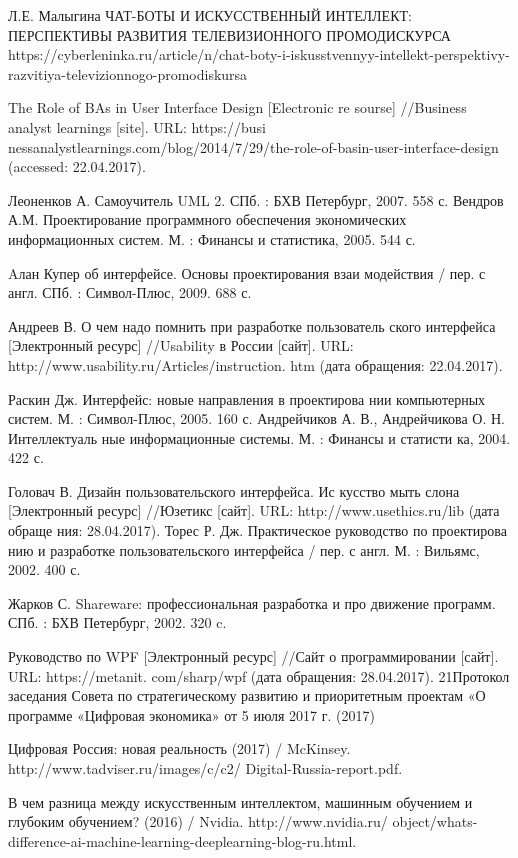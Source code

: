 \documentclass{article}
\begin{document}
 Л.Е. Малыгина
ЧАТ-БОТЫ И ИСКУССТВЕННЫЙ ИНТЕЛЛЕКТ: ПЕРСПЕКТИВЫ РАЗВИТИЯ ТЕЛЕВИЗИОННОГО ПРОМОДИСКУРСА 
https://cyberleninka.ru/article/n/chat-boty-i-iskusstvennyy-intellekt-perspektivy-razvitiya-televizionnogo-promodiskursa

The Role of BAs in User Interface Design [Electronic re  sourse] //Business analyst learnings [site]. URL: https://busi  nessanalystlearnings.com/blog/2014/7/29/the-role-of-basin-user-interface-design (accessed: 22.04.2017). 

Леоненков А. Самоучитель UML 2. СПб. : БХВ Петербург, 2007. 558 с.
 Вендров А.М. Проектирование программного обеспечения экономических информационных систем. М. : Финансы и статистика, 2005. 544 с.

Aлан Купер об интерфейсе. Основы проектирования взаи  модействия / пер. с англ. СПб. : Символ-Плюс, 2009. 688 с.

Андреев В. О чем надо помнить при разработке пользователь  ского интерфейса [Электронный ресурс] //Usability в России [сайт]. URL: http://www.usability.ru/Articles/instruction. htm (дата обращения: 22.04.2017).

 Раскин Дж. Интерфейс: новые направления в проектирова  нии компьютерных систем. М. : Символ-Плюс, 2005. 160 с.
 Андрейчиков А. В., Андрейчикова О. Н. Интеллектуаль  ные информационные системы. М. : Финансы и статисти  ка, 2004. 422 с.

Головач В. Дизайн пользовательского интерфейса. Ис  кусство мыть слона [Электронный ресурс] //Юзетикс [сайт]. URL: http://www.usethics.ru/lib (дата обраще  ния: 28.04.2017).
Торес Р. Дж. Практическое руководство по проектирова  нию и разработке пользовательского интерфейса / пер. с англ. М. : Вильямс, 2002. 400 с.

 Жарков С. Shareware: профессиональная разработка и про  движение программ. СПб. : БХВ Петербург, 2002. 320 c.

 Руководство по WPF [Электронный ресурс] //Сайт о программировании [сайт]. URL: https://metanit. com/sharp/wpf (дата обращения: 28.04.2017). 
21Протокол заседания Совета по стратегическому развитию и приоритетным проектам «О программе «Цифровая экономика» от 5 июля 2017 г. (2017) 

 Цифровая Россия: новая реальность (2017) / McKinsey. http://www.tadviser.ru/images/c/c2/ Digital-Russia-report.pdf.

 В чем разница между искусственным интеллектом, машинным обучением и глубоким обучением? (2016) / Nvidia. http://www.nvidia.ru/ object/whats-difference-ai-machine-learning-deeplearning-blog-ru.html. 
\end{document}
